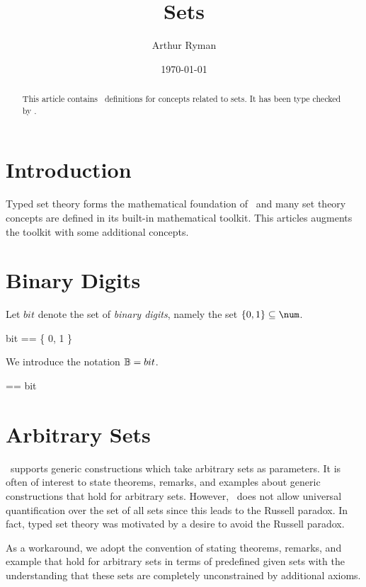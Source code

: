 \documentclass{amsart}
\begin{document}
\title{Sets}
\author{Arthur Ryman}
\date{\today}

\begin{abstract}
This article contains \ZN\ definitions for 
concepts related to sets.
It has been type checked by \fuzz.
\end{abstract}

\maketitle

\tableofcontents

\section{Introduction}

Typed set theory forms the mathematical foundation of \ZN\
and many set theory concepts are defined in its built-in mathematical toolkit. 
This articles augments the toolkit with some additional concepts.

\section{Binary Digits}

Let $bit$ denote the set of \textit{binary digits}, namely the set $\{ 0, 1\} \subseteq \num$.

\begin{zed}
	bit == \{ 0, 1 \}
\end{zed}

We introduce the notation $\mathbb{B} = bit$.

\begin{zed}
	\B == bit
\end{zed}

\section{Arbitrary Sets}

\ZN\ supports generic constructions which take arbitrary sets as parameters.
It is often of interest to state theorems, remarks, and examples about generic constructions that hold for arbitrary sets.
However, \ZN\ does not allow universal quantification over the set of all sets since this leads to the Russell paradox.
In fact, typed set theory was motivated by a desire to avoid the Russell paradox.

As a workaround, we adopt the convention of stating theorems, remarks, and example that hold for arbitrary sets in terms
of predefined given sets with the understanding that these sets are completely unconstrained by additional axioms.
\end{document}
